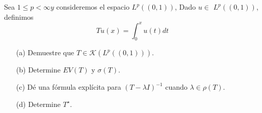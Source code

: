 Sea $1 \leq p<\infty y$ consideremos el espacio $L^p((0,1))$, Dado $u \in$ $L^p((0,1))$, definimos
$$
T u(x)=\int_0^x u(t) d t
$$
\begin{itemize}
    \item[(a)] Demuestre que $T \in \mathcal{K}\left(L^p((0,1))\right)$.
\item[(b)] Determine $E V(T)$ y $\sigma(T)$.
\item[(c)] Dé una fórmula explícita para $(T-\lambda I)^{-1}$ cuando $\lambda \in \rho(T)$.
\item[(d)] Determine $T^{\star}$. 
\end{itemize}
